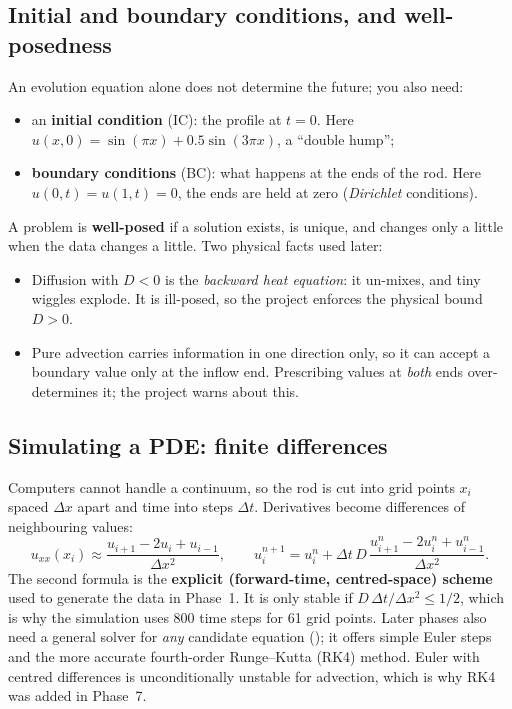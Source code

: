 \subsection{Initial and boundary conditions, and well-posedness}

An evolution equation alone does not determine the future; you also need:
\begin{itemize}
  \item an \textbf{initial condition} (IC): the profile at $t=0$. Here
        $u(x,0) = \sin(\pi x) + 0.5\sin(3\pi x)$, a ``double hump'';
  \item \textbf{boundary conditions} (BC): what happens at the ends of the rod. Here $u(0,t)=u(1,t)=0$, the ends
        are held at zero (\emph{Dirichlet} conditions).
\end{itemize}
A problem is \textbf{well-posed} if a solution exists, is unique, and changes only a little when the data changes
a little. Two physical facts used later:
\begin{itemize}
  \item Diffusion with $D<0$ is the \emph{backward heat equation}: it un-mixes, and tiny wiggles explode. It is
        ill-posed, so the project enforces the physical bound $D>0$.
  \item Pure advection carries information in one direction only, so it can accept a boundary value only at the
        inflow end. Prescribing values at \emph{both} ends over-determines it; the project warns about this.
\end{itemize}

\subsection{Simulating a PDE: finite differences}

Computers cannot handle a continuum, so the rod is cut into grid points $x_i$ spaced $\Delta x$ apart and time
into steps $\Delta t$. Derivatives become differences of neighbouring values:
\[
  u_{xx}(x_i) \approx \frac{u_{i+1} - 2u_i + u_{i-1}}{\Delta x^2}, \qquad
  u^{n+1}_i = u^n_i + \Delta t\, D\, \frac{u^n_{i+1} - 2u^n_i + u^n_{i-1}}{\Delta x^2}.
\]
The second formula is the \textbf{explicit (forward-time, centred-space) scheme} used to generate the data in
Phase~1. It is only stable if $D\,\Delta t/\Delta x^2 \le 1/2$, which is why the simulation uses 800 time
steps for 61 grid points. Later phases also need a general solver for \emph{any} candidate equation
(); it offers simple Euler steps and the more accurate fourth-order
Runge--Kutta (RK4) method. Euler with centred differences is unconditionally unstable for advection, which is
why RK4 was added in Phase~7.

